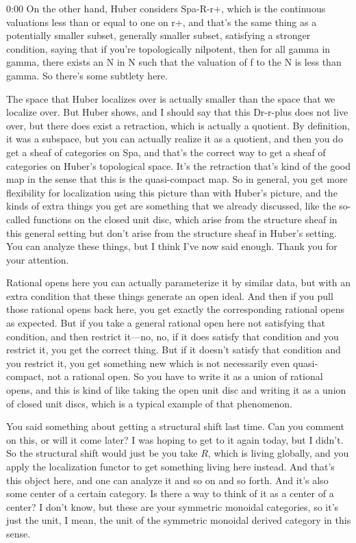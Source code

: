 \begin{unfinished}{0:00}
On the other hand, Huber considers Spa-R-r+, which is the continuous valuations less than or equal to one on r+, and that's the same thing as a potentially smaller subset, generally smaller subset, satisfying a stronger condition, saying that if you're topologically nilpotent, then for all gamma in gamma, there exists an N in N such that the valuation of f to the N is less than gamma. So there's some subtlety here.

The space that Huber localizes over is actually smaller than the space that we localize over. But Huber shows, and I should say that this Dr-r-plus does not live over, but there does exist a retraction, which is actually a quotient. By definition, it was a subspace, but you can actually realize it as a quotient, and then you do get a sheaf of categories on Spa, and that's the correct way to get a sheaf of categories on Huber's topological space. It's the retraction that's kind of the good map in the sense that this is the quasi-compact map. So in general, you get more flexibility for localization using this picture than with Huber's picture, and the kinds of extra things you get are something that we already discussed, like the so-called functions on the closed unit disc, which arise from the structure sheaf in this general setting but don't arise from the structure sheaf in Huber's setting. You can analyze these things, but I think I've now said enough. Thank you for your attention.

Rational opens here you can actually parameterize it by similar data, but with an extra condition that these things generate an open ideal. And then if you pull those rational opens back here, you get exactly the corresponding rational opens as expected. But if you take a general rational open here not satisfying that condition, and then restrict it---no, no, if it does satisfy that condition and you restrict it, you get the correct thing. But if it doesn't satisfy that condition and you restrict it, you get something new which is not necessarily even quasi-compact, not a rational open. So you have to write it as a union of rational opens, and this is kind of like taking the open unit disc and writing it as a union of closed unit discs, which is a typical example of that phenomenon.

You said something about getting a structural shift last time. Can you comment on this, or will it come later? I was hoping to get to it again today, but I didn't. So the structural shift would just be you take $R$, which is living globally, and you apply the localization functor to get something living here instead. And that's this object here, and one can analyze it and so on and so forth. And it's also some center of a certain category. Is there a way to think of it as a center of a center? I don't know, but these are your symmetric monoidal categories, so it's just the unit, I mean, the unit of the symmetric monoidal derived category in this sense.


\end{unfinished}
